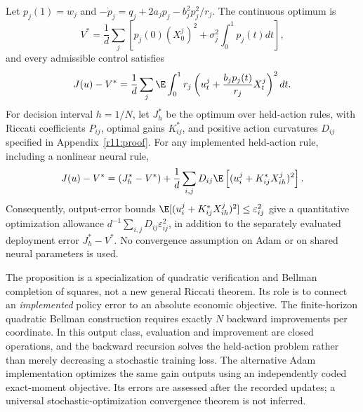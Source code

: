\begin{proposition}\label{r11:decomposition}
Let $p_j(1)=w_j$ and $-\dot p_j=q_j+2a_jp_j-b_j^2p_j^2/r_j$. The continuous optimum is
\begin{equation}\label{r11:reference}
 V^*=\frac1d\sum_j\left[p_j(0)(X^j_0)^2+\sigma_j^2\int_0^1p_j(t)dt\right],
\end{equation}
and every admissible control satisfies
\begin{equation}\label{r11:continuousdefect}
 J(u)-V^*=\frac1d\sum_j\E\int_0^1r_j\left(u^j_t+\frac{b_jp_j(t)}{r_j}X^j_t\right)^2dt.
\end{equation}
For decision interval $h=1/N$, let $J_h^*$ be the optimum over held-action rules, with Riccati coefficients $P_{ij}$, optimal gains $K^*_{ij}$, and positive action curvatures $D_{ij}$ specified in Appendix~\ref{r11:proof}. For any implemented held-action rule, including a nonlinear neural rule,
\begin{equation}\label{r11:twodefect}
 J(u)-V^*=(J_h^*-V^*)+
 \frac1d\sum_{i,j}D_{ij}\E\left[(u^j_i+K^*_{ij}X^j_{ih})^2\right].
\end{equation}
Consequently, output-error bounds $\E[(u_i^j+K^*_{ij}X^j_{ih})^2]\leq\varepsilon_{ij}^2$ give a quantitative optimization allowance $d^{-1}\sum_{i,j}D_{ij}\varepsilon_{ij}^2$, in addition to the separately evaluated deployment error $J_h^*-V^*$. No convergence assumption on Adam or on shared neural parameters is used.
\end{proposition}

The proposition is a specialization of quadratic verification and Bellman completion of squares, not a new general Riccati theorem. Its role is to connect an \emph{implemented} policy error to an absolute economic objective. The finite-horizon quadratic Bellman construction requires exactly $N$ backward improvements per coordinate. In this output class, evaluation and improvement are closed operations, and the backward recursion solves the held-action problem rather than merely decreasing a stochastic training loss. The alternative Adam implementation optimizes the same gain outputs using an independently coded exact-moment objective. Its errors are assessed after the recorded updates; a universal stochastic-optimization convergence theorem is not inferred.

